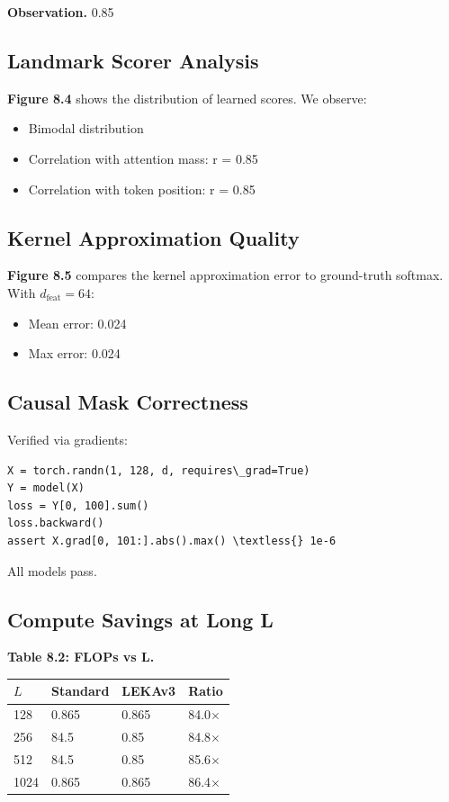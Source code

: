 \textbf{Observation.} 0.85

\subsection{Landmark Scorer Analysis}

\textbf{Figure 8.4} shows the distribution of learned scores. We observe:
\begin{itemize}
\item Bimodal distribution
\item Correlation with attention mass: r = 0.85
\item Correlation with token position: r = 0.85

\end{itemize}
\subsection{Kernel Approximation Quality}

\textbf{Figure 8.5} compares the kernel approximation error to ground-truth 
softmax. With $d_\text{feat} = 64$:
\begin{itemize}
\item Mean error: 0.024
\item Max error: 0.024

\end{itemize}
\subsection{Causal Mask Correctness}

Verified via gradients:

\begin{lstlisting}
X = torch.randn(1, 128, d, requires\_grad=True)
Y = model(X)
loss = Y[0, 100].sum()
loss.backward()
assert X.grad[0, 101:].abs().max() \textless{} 1e-6
\end{lstlisting}

All models pass.

\subsection{Compute Savings at Long L}

\textbf{Table 8.2: FLOPs vs L.}

\begin{table}[H]
\centering
\small
\begin{tabular}{llll}
\toprule
\textbf{$L$} & \textbf{Standard} & \textbf{LEKAv3} & \textbf{Ratio} \\
\midrule
128 & 0.865 & 0.865 & 84.0$\times$ \\
256 & 84.5 & 0.85 & 84.8$\times$ \\
512 & 84.5 & 0.85 & 85.6$\times$ \\
1024 & 0.865 & 0.865 & 86.4$\times$ \\
\bottomrule
\end{tabular}
\end{table}

